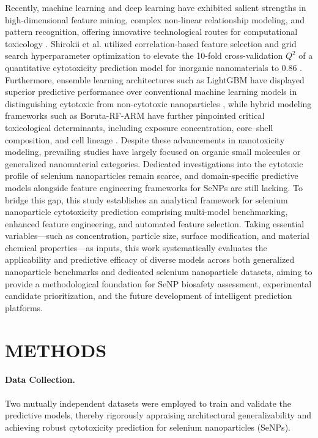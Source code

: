 \documentclass[letterpaper]{article}
\begin{document}
Recently, machine learning and deep learning have exhibited salient strengths in high-dimensional feature mining, complex non-linear relationship modeling, and pattern recognition, offering innovative technological routes for computational toxicology \cite{hosni2025mlnp}. Shirokii et al. utilized correlation-based feature selection and grid search hyperparameter optimization to elevate the 10-fold cross-validation $Q^2$ of a quantitative cytotoxicity prediction model for inorganic nanomaterials to 0.86 \cite{shirokii2023quantitative}. Furthermore, ensemble learning architectures such as LightGBM have displayed superior predictive performance over conventional machine learning models in distinguishing cytotoxic from non-cytotoxic nanoparticles \cite{hosni2025mlnp}, while hybrid modeling frameworks such as Boruta-RF-ARM have further pinpointed critical toxicological determinants, including exposure concentration, core--shell composition, and cell lineage \cite{yildirim2025rheumatoid}. Despite these advancements in nanotoxicity modeling, prevailing studies have largely focused on organic small molecules or generalized nanomaterial categories. Dedicated investigations into the cytotoxic profile of selenium nanoparticles remain scarce, and domain-specific predictive models alongside feature engineering frameworks for SeNPs are still lacking. To bridge this gap, this study establishes an analytical framework for selenium nanoparticle cytotoxicity prediction comprising multi-model benchmarking, enhanced feature engineering, and automated feature selection. Taking essential variables—such as concentration, particle size, surface modification, and material chemical properties—as inputs, this work systematically evaluates the applicability and predictive efficacy of diverse models across both generalized nanoparticle benchmarks and dedicated selenium nanoparticle datasets, aiming to provide a methodological foundation for SeNP biosafety assessment, experimental candidate prioritization, and the future development of intelligent prediction platforms.

\section{METHODS}

\paragraph{Data Collection.}
Two mutually independent datasets were employed to train and validate the predictive models, thereby rigorously appraising architectural generalizability and achieving robust cytotoxicity prediction for selenium nanoparticles (SeNPs).
\end{document}
